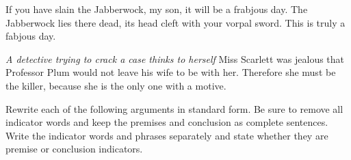 \begin{exercises}
\item If you have slain the Jabberwock, my son, it will be a frabjous day. The Jabberwock lies there dead, its head cleft with your vorpal sword. This is truly a fabjous day. 

\item \textit{A detective trying to crack a case thinks to herself} Miss Scarlett was jealous that Professor Plum would not leave his wife to be with her. Therefore she must be the killer, because she is the only one with a motive. 
\end{exercises}



\noindent\problempart Rewrite each of the following arguments in standard form. Be sure to remove all indicator words and keep the premises and conclusion as complete sentences. Write the indicator words and phrases separately and state whether they are premise or conclusion indicators. 


